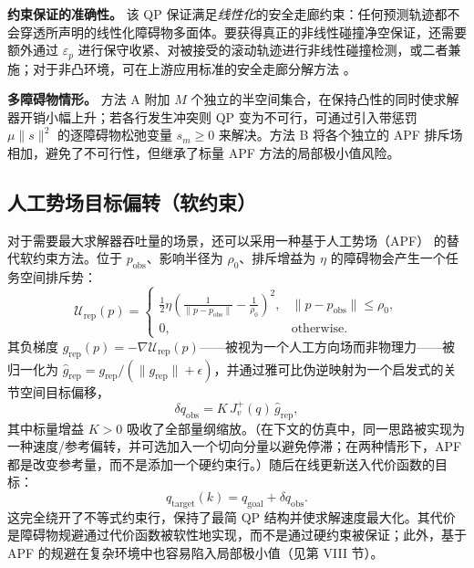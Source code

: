 \textbf{约束保证的准确性。} 该 QP 保证满足\emph{线性化}的安全走廊约束：任何预测轨迹都不会穿透所声明的线性化障碍物多面体。要获得真正的非线性碰撞净空保证，还需要额外通过 \(\varepsilon_p\) 进行保守收紧、对被接受的滚动轨迹进行非线性碰撞检测，或二者兼施；对于非凸环境，可在上游应用标准的安全走廊分解方法 \cite{safe_corridor}。

\textbf{多障碍物情形。} 方法 A 附加 \(M\) 个独立的半空间集合，在保持凸性的同时使求解器开销小幅上升；若各行发生冲突则 QP 变为不可行，可通过引入带惩罚 \(\mu \|s\|^2\) 的逐障碍物松弛变量 \(s_m \geq 0\) 来解决。方法 B 将各个独立的 APF 排斥场相加，避免了不可行性，但继承了标量 APF 方法的局部极小值风险。

\subsection{人工势场目标偏转（软约束）}\label{b.-artificial-potential-field-target-deflection-soft-constraint}

对于需要最大求解器吞吐量的场景，还可以采用一种基于人工势场（APF）\cite{khatib1986} 的替代软约束方法。位于 \(p_{\text{obs}}\)、影响半径为 \(\rho_0\)、排斥增益为 \(\eta\) 的障碍物会产生一个任务空间排斥势：
\begin{equation}
\label{eq:apf-potential}
\mathcal{U}_{\text{rep}}(p) =
\begin{cases}
\frac{1}{2} \eta
\left(\frac{1}{\|p - p_{\text{obs}}\|} - \frac{1}{\rho_0}\right)^2,
& \|p - p_{\text{obs}}\| \leq \rho_0,\\
0, & \text{otherwise}.
\end{cases}
\end{equation}
其负梯度 \(g_{\text{rep}}(p)=-\nabla \mathcal{U}_{\text{rep}}(p)\)——被视为一个人工方向场而非物理力——被归一化为
\(\hat{g}_{\text{rep}}=g_{\text{rep}}/(\|g_{\text{rep}}\|+\epsilon)\)，并通过雅可比伪逆映射为一个启发式的关节空间目标偏移，
\begin{equation}
\label{eq:apf-target-shift}
\delta q_{\text{obs}} = K \, J_v^+(q) \, \hat{g}_{\text{rep}},
\end{equation}
其中标量增益 \(K > 0\) 吸收了全部量纲缩放。（在下文的仿真中，同一思路被实现为一种速度/参考偏转，并可选加入一个切向分量以避免停滞；在两种情形下，APF 都是改变参考量，而不是添加一个硬约束行。）随后在线更新送入代价函数的目标：
\begin{equation}
\label{eq:apf-target}
q_{\text{target}}(k) = q_{\text{goal}} + \delta q_{\text{obs}} .
\end{equation}
这完全绕开了不等式约束行，保持了最简 QP 结构并使求解速度最大化。其代价是障碍物规避通过代价函数被软性地实现，而不是通过硬约束被保证；此外，基于 APF 的规避在复杂环境中也容易陷入局部极小值（见第 VIII 节）。

